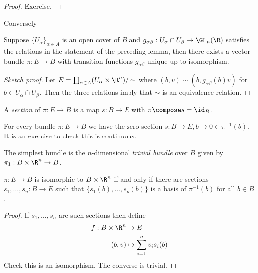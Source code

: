\documentclass[a4paper]{article}
\begin{document}
\begin{proof}
  Exercise.
\end{proof}

Conversely

\begin{proposition}
  Suppose \(\{U_\alpha\}_{\alpha \in A}\) is an open cover of \(B\) and \(g_{\alpha\beta}: U_\alpha \cap U_\beta \to \GL_n(\R)\) satisfies the relations in the statement of the preceding lemma, then there exists a vector bundle \(\pi: E \to B\) with transition functions \(g_{\alpha\beta}\) unique up to isomorphism.
\end{proposition}

\begin{proof}[Sketch proof]
  Let \(E = \coprod_{\alpha \in A} (U_\alpha \times \R^n)/\sim\) where \((b, v) \sim (b, g_{\alpha\beta}(b) v)\) for \(b \in U_\alpha \cap U_\beta\). Then the three relations imply that \(\sim\) is an equivalence relation.
\end{proof}

\begin{definition}[section]
  A \emph{section} of \(\pi: E \to B\) is a map \(s: B \to E\) with \(\pi \compose s = \id_B\).
\end{definition}

\begin{eg}
  For every bundle \(\pi: E \to B\) we have the zero section \(s: B \to E, b \mapsto 0 \in \pi^{-1}(b)\). It is an exercise to check this is continuous.
\end{eg}

The simplest bundle is the \(n\)-dimensional \emph{trivial bundle} over \(B\) given by \(\pi_1: B \times \R^n \to B\).

\begin{proposition}
  \(\pi: E \to B\) is isomorphic to \(B \times \R^n\) if and only if there are sections \(s_1, \dots, s_n: B \to E\) such that \(\{s_1(b), \dots, s_n(b)\}\) is a basis of \(\pi^{-1}(b)\) for all \(b \in B\).
\end{proposition}

\begin{proof}
  If \(s_1, \dots, s_n\) are such sections then define
  \begin{align*}
    f: B \times \R^n &\to E \\
    (b, v) &\mapsto \sum_{i = 1}^n v_i s_i(b)
  \end{align*}
  Check this is an isomorphism. The converse is trivial.
\end{proof}
\end{document}
